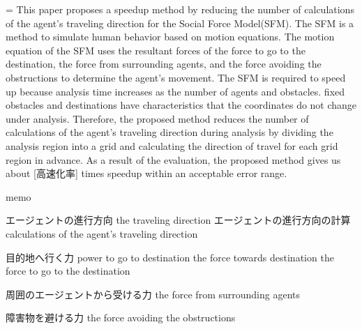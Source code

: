 ={
This paper proposes a speedup method by reducing the number of 
calculations of the agent's traveling direction for the Social Force Model(SFM).
The SFM is a method to simulate human behavior based on motion equations.
The motion equation of the SFM uses the resultant forces of the force to go to the destination,
the force from surrounding agents, and the force avoiding the obstructions to determine the agent's
movement.
The SFM is required to speed up because analysis time increases as the number of agents and obstacles.
fixed obstacles and destinations have characteristics that the coordinates do not change under analysis.
Therefore, the proposed method reduces the number of calculations of the agent's traveling direction 
during analysis by dividing the analysis region into a grid and calculating the direction of travel 
for each grid region in advance.
As a result of the evaluation, 
the proposed method gives us about [高速化率] times speedup within an acceptable error range.
}%

memo

エージェントの進行方向
the traveling direction
エージェントの進行方向の計算
calculations of the agent's traveling direction

目的地へ行く力
power to go to destination
the force towards destination
the force to go to the destination

周囲のエージェントから受ける力
the force from surrounding agents

障害物を避ける力
the force avoiding the obstructions

\fi
